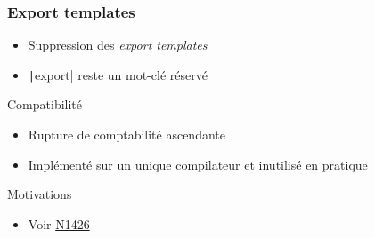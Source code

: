 \documentclass[C++.tex]{subfiles}
\begin{document}
\begin{frame}[fragile]
	\frametitle{Export templates}
	\begin{itemize}
		\item Suppression des \textit{export templates}
		\item \texttt|export| reste un mot-clé réservé
	\end{itemize}

	\begin{block}{Compatibilité}
		\begin{itemize}
			\item Rupture de comptabilité ascendante
			\item Implémenté sur un unique compilateur et inutilisé en pratique
		\end{itemize}

	\end{block}

	\begin{block}{Motivations}
		\begin{itemize}
			\item Voir \href{http://www.open-std.org/jtc1/sc22/wg21/docs/papers/2003/n1426.pdf}{N1426}
		\end{itemize}

	\end{block}
\end{frame}
\end{document}
